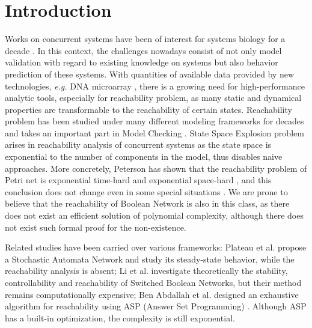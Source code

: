 \documentclass[runningheads]{llncs}
\begin{document}
\section{Introduction}
\label{intro}
Works on concurrent systems have been of interest for systems biology for a decade \cite{bockmayr2002using,bortolussi2008modeling,wiley2003computational}. In this context, the challenges nowadays consist of not only model validation with regard to existing knowledge on systems but also behavior prediction of these systems. 
With quantities of available data provided by new technologies, \textit{e.g.} DNA microarray \cite{marx2013}, there is a growing need for high-performance analytic tools, especially for reachability problem, as many static and dynamical properties are transformable to the reachability of certain states. Reachability problem has been studied under many different modeling frameworks for decades \cite{akutsu2007control,barrett2006complexity,Daws1998,esparza1998,mayr1984,wozna2003} and takes an important part in Model Checking \cite{clarke20142}. State Space Explosion problem arises in reachability analysis of concurrent systems as the state space is exponential to the number of components in the model, thus disables naive approaches. More concretely, Peterson has shown that the reachability problem of Petri net is exponential time-hard and exponential space-hard \cite{peterson1977petri}, and this conclusion does not change even in some special situations \cite{esparza1998}. We are prone to believe that the reachability of Boolean Network is also in this class, as there does not exist an efficient solution of polynomial complexity, although there does not exist such formal proof for the non-existence.

Related studies have been carried over various frameworks: Plateau et al. \cite{plateau1991stochastic} propose a Stochastic Automata Network and study its steady-state behavior, while the reachability analysis is absent; Li et al. \cite{li2012reachability,li2014stability} investigate theoretically the stability, controllability and reachability of Switched Boolean Networks, but their method remains computationally expensive; Ben Abdallah et al. \cite{abdallah2015exhaustive} designed an exhaustive algorithm for reachability using ASP (Answer Set Programming) \cite{baral2003knowledge}. Although ASP has a built-in optimization, the complexity is still exponential. 
\end{document}
